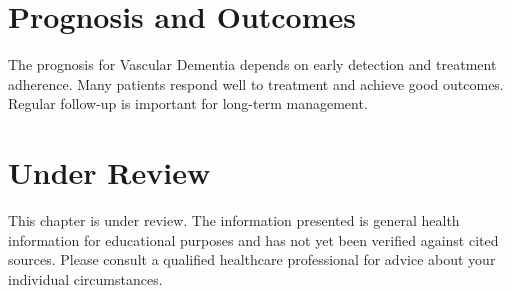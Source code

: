 \section*{Prognosis and Outcomes}
The prognosis for Vascular Dementia depends on early detection and treatment adherence. Many patients respond well to treatment and achieve good outcomes. Regular follow-up is important for long-term management.
\section*{Under Review}
This chapter is under review. The information presented is general health information for educational purposes and has not yet been verified against cited sources. Please consult a qualified healthcare professional for advice about your individual circumstances.


\clearpage
